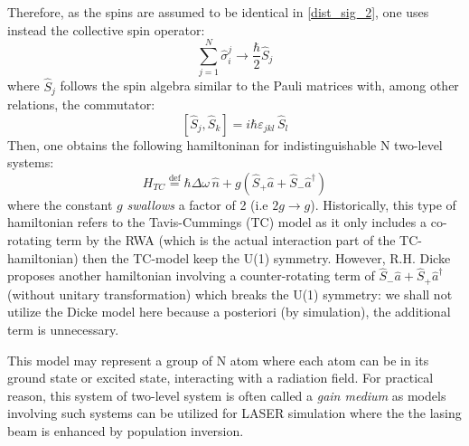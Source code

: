 \documentclass[12pt]{report}
\begin{document}
Therefore, as the spins are assumed to be identical in \eqref{dist_sig_2}, one uses instead the collective spin operator:
\begin{equation}
\sum_{j=1}^{N} \hat{\sigma}_i^j \rightarrow \frac{\hbar}{2} \hat{S}_j
\end{equation}
where $\hat{S}_j$ follows the spin algebra similar to the Pauli matrices with, among other relations, the commutator:
\begin{equation}
{\displaystyle [\hat{S} _{j},\hat{S} _{k}]=i\hbar\varepsilon _{jkl}\,\hat{S} _{l}}
\end{equation}
Then, one obtains the following hamiltoninan for indistinguishable N two-level systems:
\begin{equation}
H_{TC} \stackrel{\text{def}}{=} \hbar\Delta\omega\,\hat{n} + g \left(\hat{S}_+ \hat{a} + \hat{S}_-\hat{a}^{\dag} \right)
\end{equation}
where the constant $g$ \textit{swallows} a factor of 2 (i.e $2g \rightarrow g$). Historically, this type of hamiltonian refers to the Tavis-Cummings (TC) model as it only includes a co-rotating term by the RWA (which is the actual interaction part of the TC-hamiltonian) then the TC-model keep the U(1) symmetry. However, R.H. Dicke proposes another hamiltonian involving a counter-rotating term of $\hat{S}_- \hat{a} + \hat{S}_+\hat{a}^{\dag}$ (without unitary transformation) which breaks the U(1) symmetry: we shall not utilize the Dicke model here because a posteriori (by simulation), the additional term is unnecessary.

This model may represent a group of N atom where each atom can be in its ground state or excited state, interacting with a radiation field. For practical reason, this system of two-level system is often called a \textit{gain medium} as models involving such systems can be utilized for LASER simulation where the the lasing beam is enhanced by population inversion.
\end{document}
